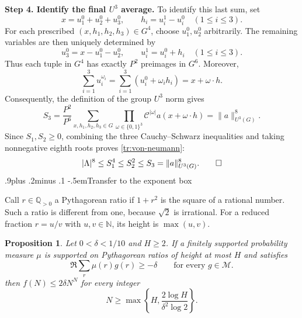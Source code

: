 \documentclass[twoside]{aomart}
\makeatletter
\theoremstyle{paperplain}
\newtheorem{proposition}[theorem]{Proposition}
\theoremstyle{paperdefinition}
\renewcommand\subsection{\@startsection{subsection}{2}{\z@}
  {.9\baselineskip plus .2\baselineskip minus .1\baselineskip}
  {-.5em}{\normalfont\bfseries}}
\renewenvironment{proof}[1][\proofname]{\par\pushQED{\qed}%
  \normalfont\topsep6\p@\@plus3\p@\relax\trivlist
  \item[\hskip\labelsep\itshape #1\@addpunct{.}]\ignorespaces
}{\popQED\endtrivlist\@endpefalse}
\newcommand{\N}{\mathbb N}
\newcommand{\Q}{\mathbb Q}
\numberwithin{equation}{section}
\makeatother
\begin{document}
\begin{proof}
\medskip
\noindent\textbf{Step 4. Identify the final $U^3$ average.}
To identify this last sum, set
\begin{equation*}
 x=u_1^0+u_2^0+u_3^0,\qquad
 h_i=u_i^1-u_i^0\quad(1\le i\le3).
\end{equation*}
For each prescribed $(x,h_1,h_2,h_3)\in G^4$, choose $u_1^0,u_2^0$
arbitrarily. The remaining variables are then uniquely determined by
\begin{equation*}
 u_3^0=x-u_1^0-u_2^0,\qquad
 u_i^1=u_i^0+h_i\quad(1\le i\le3).
\end{equation*}
Thus each tuple in $G^4$ has exactly $P^2$ preimages in $G^6$.
Moreover,
\begin{equation*}
 \sum_{i=1}^3u_i^{\omega_i}
 =\sum_{i=1}^3(u_i^0+\omega_i h_i)=x+\omega\cdot h.
\end{equation*}
Consequently, the definition of the group $U^3$ norm gives
\begin{equation*}
 S_3=\frac{P^2}{P^6}\sum_{x,h_1,h_2,h_3\in G}
       \prod_{\omega\in\{0,1\}^3}
          \mathcal C^{|\omega|}a(x+\omega\cdot h)
 =\|a\|_{U^3(G)}^8.
\end{equation*}
Since $S_1,S_2\ge0$, combining the three Cauchy--Schwarz inequalities
and taking nonnegative eighth roots proves \eqref{tr:von-neumann}:
\begin{equation*}
 |\Lambda|^8\le S_1^4\le S_2^2\le S_3=\|a\|_{U^3(G)}^8.\qedhere
\end{equation*}
\end{proof}
\subsection{Transfer to the exponent box}

Call $r\in\Q_{>0}$ a Pythagorean ratio if $1+r^2$ is the square
of a rational number. Such a ratio is different from one, because
$\sqrt2$ is irrational. For a reduced fraction $r=u/v$ with
$u,v\in\N$, its height is $\max(u,v)$.

\begin{proposition}\label{tr:finite-transfer}
Let $0<\delta<1/10$ and $H\ge2$. If a finitely supported
probability measure $\mu$ is supported on Pythagorean ratios of
height at most $H$ and satisfies
\begin{equation}
 \Re\sum_r\mu(r)g(r)\ge-\delta
                  \qquad\text{for every }g\in\mathcal M.
 \label{tr:positive-measure-hypothesis}
\end{equation}
then $f(N)\le2\delta N^N$ for every integer
\begin{equation}
 N\ge\max\left\{H,\frac{2\log H}{\delta^2\log2}\right\}.
 \label{tr:cube-size}
\end{equation}
\end{proposition}
\end{document}
